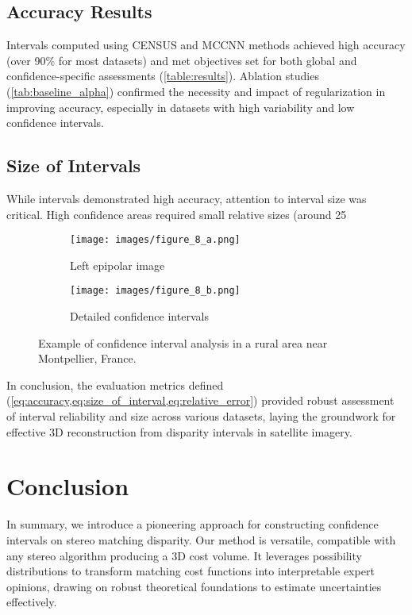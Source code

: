 \subsection{Accuracy Results}\label{sec:accuracy}
Intervals computed using CENSUS and MCCNN methods achieved high accuracy (over 90\% for most datasets) and met objectives set for both global and confidence-specific assessments (\cref{table:results}). Ablation studies (\cref{tab:baseline_alpha}) confirmed the necessity and impact of regularization in improving accuracy, especially in datasets with high variability and low confidence intervals.

\subsection{Size of Intervals}\label{sec:size}
While intervals demonstrated high accuracy, attention to interval size was critical. High confidence areas required small relative sizes (around 25%

\begin{figure}[ht]
\centering\begin{subfigure}{0.5\linewidth}
  \texttt{[image: images/figure\_8\_a.png]}
  \caption{Left epipolar image}
    \label{fig:fig_8_a}
\end{subfigure}
\begin{subfigure}{1\linewidth}
    \centering
  \texttt{[image: images/figure\_8\_b.png]}
    \caption{Detailed confidence intervals}
  \label{fig:fig_8_b}
\end{subfigure}
\caption{Example of confidence interval analysis in a rural area near Montpellier, France.}
\label{fig:fig_8}
\end{figure}

In conclusion, the evaluation metrics defined (\cref{eq:accuracy,eq:size_of_interval,eq:relative_error}) provided robust assessment of interval reliability and size across various datasets, laying the groundwork for effective 3D reconstruction from disparity intervals in satellite imagery.


\section{Conclusion}
In summary, we introduce a pioneering approach for constructing confidence intervals on stereo matching disparity. Our method is versatile, compatible with any stereo algorithm producing a 3D cost volume. It leverages possibility distributions to transform matching cost functions into interpretable expert opinions, drawing on robust theoretical foundations to estimate uncertainties effectively.

